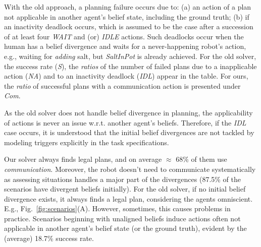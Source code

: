 \documentclass[letterpaper]{article} %
\begin{document}

With the old approach, a planning failure occurs due to: 
(a) an action of a plan not applicable in another agent's belief state, including the ground truth; 
(b) if an inactivity deadlock occurs, which is assumed to be the case after a succession of at least four {\em WAIT} and (or) {\em IDLE} actions. 
Such deadlocks occur when the human has a belief divergence and waits for a never-happening robot's action, e.g., waiting for \textit{adding} salt, but \textit{SaltInPot} is already achieved.
For the old solver, the success rate (\textit{S}), the \textit{ratios} of the number of failed plans due to a inapplicable action (\textit{NA}) and to an inactivity deadlock (\textit{IDL}) appear in the table.
For ours, the \textit{ratio} of successful plans with a communication action is presented under \textit{Com}.

As the old solver does not handle belief divergence in planning, the applicability of actions is never an issue w.r.t. another agent's beliefs. 
Therefore, if the \textit{IDL} case occurs, it is understood that the initial belief divergences are not tackled by modeling triggers explicitly in the task specifications. 

Our solver always finds legal plans, and on average $\approx$ 68\% of them use \textit{communication}.
Moreover, the robot doesn't need to communicate systematically as assessing situations handles a major part of the divergences (87.5\% of the scenarios have divergent beliefs initially).
For the old solver, if no initial belief divergence exists, it always finds a legal plan, considering the agents omniscient. 
E.g., Fig.~\ref{fig:scenarios}(A). However, sometimes, this causes problems in practice.
Scenarios beginning with unaligned beliefs induce actions often not applicable in another agent's belief state (or the ground truth), evident by the (average) 18.7\% success rate.
\end{document}
